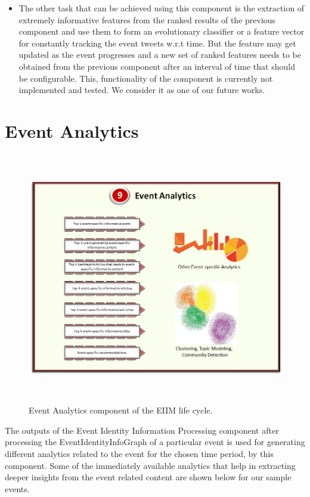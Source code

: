 \begin{itemize}
\item The other task that can be achieved using this component is the extraction of extremely informative features from the ranked results of the previous component and use them to form an evolutionary classifier or a feature vector for constantly tracking the event tweets w.r.t time. But the feature may get updated as the event progresses and a new set of ranked features needs to be obtained from the previous component after an interval of time that should be configurable. This, functionality of the component is currently not implemented and tested. We consider it as one of our future works.
\end{itemize}


\section{Event Analytics}
\begin{figure}[htbp]
  \caption{Event Analytics component of the EIIM life cycle.}
  \centering
    \includegraphics[width=14cm,height=11cm]{Figures/EIIMComponents/EventAnalytics.jpg}
\end{figure}

The outputs of the Event Identity Information Processing component after processing the EventIdentityInfoGraph of a particular event is used for generating different analytics related to the event for the chosen time period, by this component. Some of the immediately available analytics that help in extracting deeper insights from the event related content are shown below for our sample events.

